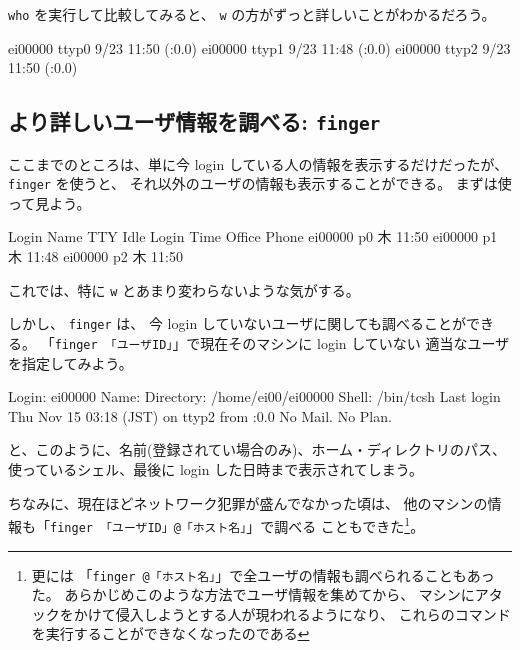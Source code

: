 \newpage

\texttt{who} を実行して比較してみると、
\texttt{w} の方がずっと詳しいことがわかるだろう。

\begin{progls}
ei00000          ttyp0     9/23 11:50   (:0.0)
ei00000          ttyp1     9/23 11:48   (:0.0)
ei00000          ttyp2     9/23 11:50   (:0.0)
%
\end{progls}

\subsection{より詳しいユーザ情報を調べる: \texttt{finger}}

ここまでのところは、単に今 login している人の情報を表示するだけだったが、
\texttt{finger} を使うと、
それ以外のユーザの情報も表示することができる。
まずは使って見よう。

\begin{progls}
Login            Name                 TTY  Idle  Login Time   Office  Phone
ei00000                               p0         木     11:50
ei00000                               p1         木     11:48
ei00000                               p2         木     11:50
%
\end{progls}

これでは、特に \texttt{w} とあまり変わらないような気がする。

\bigskip

しかし、 \texttt{finger} は、
今 login していないユーザに関しても調べることができる。
「\texttt{finger 「ユーザID」}」で現在そのマシンに login していない
適当なユーザを指定してみよう。

\begin{progls}
Login: ei00000                          Name: 
Directory: /home/ei00/ei00000           Shell: /bin/tcsh
Last login Thu Nov 15 03:18 (JST) on ttyp2 from :0.0
No Mail.
No Plan.
%
\end{progls}

と、このように、名前(登録されてい場合のみ)、ホーム・ディレクトリのパス、
使っているシェル、最後に login した日時まで表示されてしまう。

\bigskip

ちなみに、現在ほどネットワーク犯罪が盛んでなかった頃は、
他のマシンの情報も「\texttt{finger 「ユーザID」@「ホスト名」}」で調べる
こともできた\footnote{更には
「\texttt{finger @「ホスト名」}」で全ユーザの情報も調べられることもあった。
あらかじめこのような方法でユーザ情報を集めてから、
マシンにアタックをかけて侵入しようとする人が現われるようになり、
これらのコマンドを実行することができなくなったのである}。

